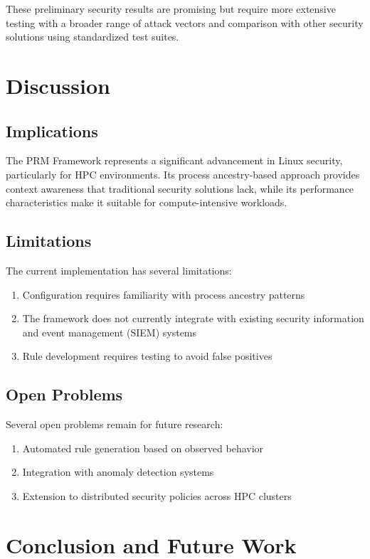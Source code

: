 \documentclass[conference]{IEEEtran}
\begin{document}
These preliminary security results are promising but require more extensive testing with a broader range of attack vectors and comparison with other security solutions using standardized test suites.

\section{Discussion}
\label{sec:discussion}

\subsection{Implications}
The PRM Framework represents a significant advancement in Linux security, particularly for HPC environments. Its process ancestry-based approach provides context awareness that traditional security solutions lack, while its performance characteristics make it suitable for compute-intensive workloads.

\subsection{Limitations}
The current implementation has several limitations:

\begin{enumerate}
\item Configuration requires familiarity with process ancestry patterns
\item The framework does not currently integrate with existing security information and event management (SIEM) systems
\item Rule development requires testing to avoid false positives
\end{enumerate}

\subsection{Open Problems}
Several open problems remain for future research:

\begin{enumerate}
\item Automated rule generation based on observed behavior
\item Integration with anomaly detection systems
\item Extension to distributed security policies across HPC clusters
\end{enumerate}

\section{Conclusion and Future Work}
\label{sec:conclusion}
\end{document}
